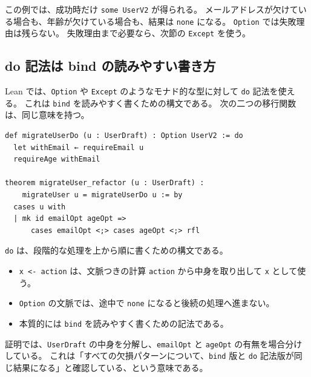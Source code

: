 この例では、成功時だけ \texttt{some UserV2} が得られる。
メールアドレスが欠けている場合も、年齢が欠けている場合も、結果は \texttt{none} になる。
\texttt{Option} では失敗理由は残らない。
失敗理由まで必要なら、次節の \texttt{Except} を使う。


\subsection{do 記法は bind の読みやすい書き方}

Lean では、\texttt{Option} や \texttt{Except} のようなモナド的な型に対して \texttt{do} 記法を使える。
これは \texttt{bind} を読みやすく書くための構文である。
次の二つの移行関数は、同じ意味を持つ。

\begin{listing}[htbp]
\begin{verbatim}
def migrateUserDo (u : UserDraft) : Option UserV2 := do
  let withEmail ← requireEmail u
  requireAge withEmail

theorem migrateUser_refactor (u : UserDraft) :
    migrateUser u = migrateUserDo u := by
  cases u with
  | mk id emailOpt ageOpt =>
      cases emailOpt <;> cases ageOpt <;> rfl
\end{verbatim}
\caption{bind 版と do 記法版の同値性}
\label{lst:ch11_do_notation}
\end{listing}

\begin{syntaxbox}
\texttt{do} は、段階的な処理を上から順に書くための構文である。
\begin{itemize}
\item \texttt{x <- action} は、文脈つきの計算 \texttt{action} から中身を取り出して \texttt{x} として使う。
\item \texttt{Option} の文脈では、途中で \texttt{none} になると後続の処理へ進まない。
\item 本質的には \texttt{bind} を読みやすく書くための記法である。
\end{itemize}
\end{syntaxbox}


証明では、\texttt{UserDraft} の中身を分解し、\texttt{emailOpt} と \texttt{ageOpt} の有無を場合分けしている。
これは「すべての欠損パターンについて、\texttt{bind} 版と \texttt{do} 記法版が同じ結果になる」と確認している、という意味である。

